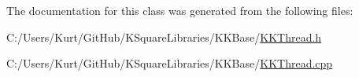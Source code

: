 The documentation for this class was generated from the following files\+:\begin{DoxyCompactItemize}
\item 
C\+:/\+Users/\+Kurt/\+Git\+Hub/\+K\+Square\+Libraries/\+K\+K\+Base/\hyperlink{_k_k_thread_8h}{K\+K\+Thread.\+h}\item 
C\+:/\+Users/\+Kurt/\+Git\+Hub/\+K\+Square\+Libraries/\+K\+K\+Base/\hyperlink{_k_k_thread_8cpp}{K\+K\+Thread.\+cpp}\end{DoxyCompactItemize}
